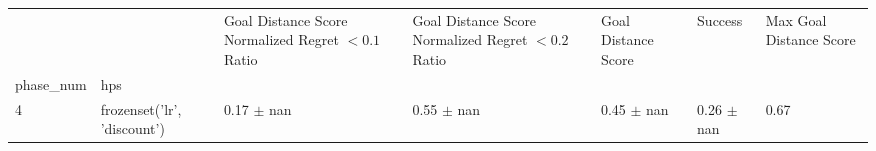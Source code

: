 \begin{tabular}{lllllll}
\toprule
 &  & Goal Distance Score Normalized Regret $< 0.1$ Ratio & Goal Distance Score Normalized Regret $< 0.2$ Ratio & Goal Distance Score & Success & Max Goal Distance Score \\
phase_num & hps &  &  &  &  &  \\
\midrule
4 & frozenset({'lr', 'discount'}) & 0.17 $\pm$ nan & 0.55 $\pm$ nan & 0.45 $\pm$ nan & 0.26 $\pm$ nan & 0.67 \\
\cline{1-7}
\bottomrule
\end{tabular}
